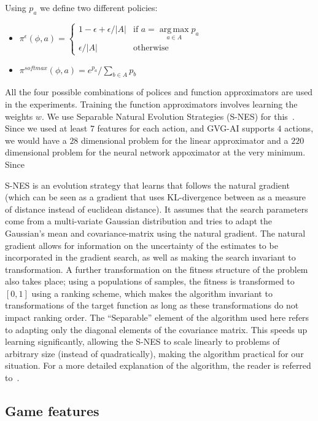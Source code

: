 \documentclass[conference]{IEEEtran}
\DeclareMathOperator*{\argmax}{arg\,max}
\newcommand{\twopartdefo}[3]
{
  \left\{
    \begin{array}{ll}
      #1 & \mbox{if } #2 \\
      #3 & \mbox{otherwise}
    \end{array}
  \right.
}
\begin{document}
Using $p_a$ we define two different policies:

\begin{itemize}
\item $\pi^\epsilon(\phi,a) = \twopartdefo{ 1-\epsilon + \epsilon/|A| }{ a = \argmax\limits_{a \in A}  p_a}{\epsilon/|A|}$
\item $\pi^{softmax}(\phi,a) = e^{p_a}/ \sum\limits_{b \in A} p_b $
\end{itemize}

All the four possible combinations of polices and function approximators are used in the experiments. Training the function approximators involves learning the weights $w$. We use Separable Natural Evolution Strategies (S-NES) for this~\cite{schaul2011high}. Since we used at least $7$ features for each action, and GVG-AI supports $4$ actions, we would have a $28$ dimensional problem for the linear approximator and a $220$ dimensional problem for the neural network appoximator at the very minimum. Since  

S-NES is an evolution strategy that learns that follows the natural gradient (which can be seen as a gradient that uses KL-divergence between as a measure of distance instead of euclidean distance). It assumes that the search parameters come from a multi-variate Gaussian distribution and tries to adapt the Gaussian's mean and covariance-matrix using the natural gradient. The natural gradient allows for information on the uncertainty of the estimates to be incorporated in the gradient search, as well as making the search invariant to transformation. A further transformation on the fitness structure of the problem also takes place; using a populations of samples, the fitness is transformed to $[0,1]$ using a ranking scheme, which makes the algorithm invariant to transformations of the target function as long as these transformations do not impact ranking order. The ``Separable'' element of the algorithm used here refers to adapting only the diagonal elements of the covariance matrix. This speeds up learning significantly, allowing the S-NES to scale linearly to problems of arbitrary size (instead of quadratically), making the algorithm practical for our situation. For a more detailed explanation of the algorithm, the reader is referred to~\cite{schaul2011high}. 

\subsection{Game features} \label{ssec:feat}
\end{document}
